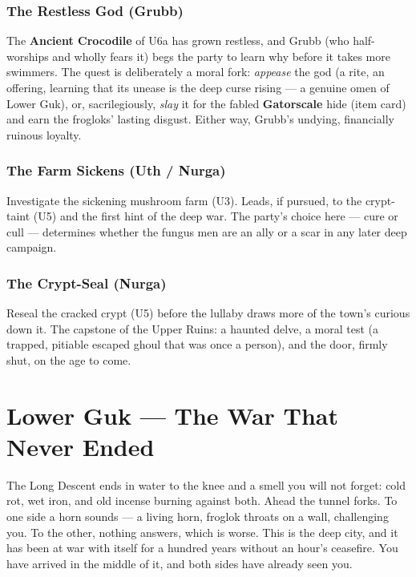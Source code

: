 \documentclass[10pt,twoside]{report}
\begin{document}
\subsection*{The Restless God (Grubb)}
The \textbf{Ancient Crocodile} of U6a has grown restless, and Grubb (who half-worships and wholly fears it) begs the party to learn why before it takes more swimmers. The quest is deliberately a moral fork: \emph{appease} the god (a rite, an offering, learning that its unease is the deep curse rising --- a genuine omen of Lower Guk), or, sacrilegiously, \emph{slay} it for the fabled \textbf{Gatorscale} hide (item card) and earn the frogloks' lasting disgust. Either way, Grubb's undying, financially ruinous loyalty.
\subsection*{The Farm Sickens (Uth / Nurga)}
Investigate the sickening mushroom farm (U3). Leads, if pursued, to the crypt-taint (U5) and the first hint of the deep war. The party's choice here --- cure or cull --- determines whether the fungus men are an ally or a scar in any later deep campaign.
\subsection*{The Crypt-Seal (Nurga)}
Reseal the cracked crypt (U5) before the lullaby draws more of the town's curious down it. The capstone of the Upper Ruins: a haunted delve, a moral test (a trapped, pitiable escaped ghoul that was once a person), and the door, firmly shut, on the age to come.

\clearpage

\chapter{Lower Guk --- The War That Never Ended}
\begin{readaloud}
The Long Descent ends in water to the knee and a smell you will not forget: cold rot, wet iron, and old incense burning against both. Ahead the tunnel forks. To one side a horn sounds --- a living horn, froglok throats on a wall, challenging you. To the other, nothing answers, which is worse. This is the deep city, and it has been at war with itself for a hundred years without an hour's ceasefire. You have arrived in the middle of it, and both sides have already seen you.
\end{readaloud}
\end{document}
